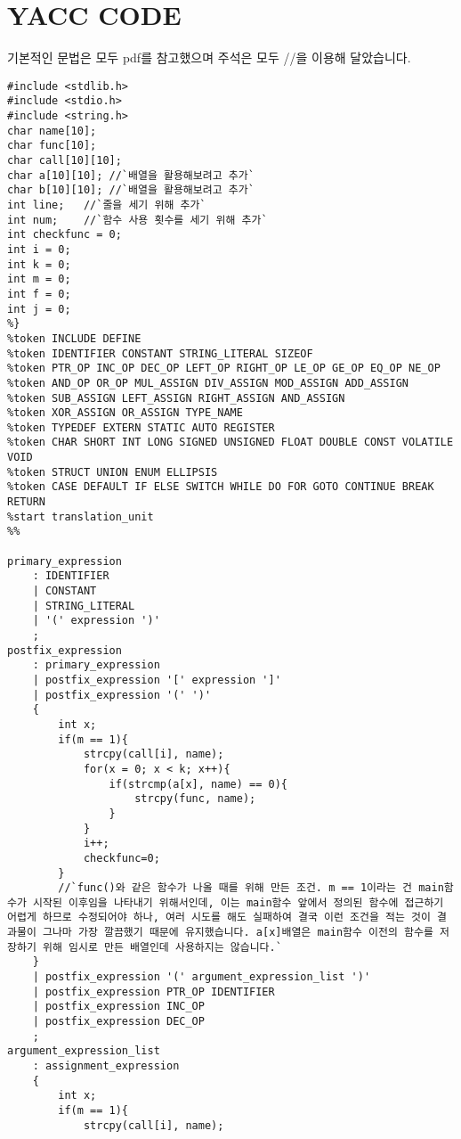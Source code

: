 \documentclass{article}
\begin{document}
\section{YACC CODE}
기본적인 문법은 모두 pdf를 참고했으며 주석은 모두 //을 이용해 달았습니다.
\begin{lstlisting}[escapeinside=``]
%{
#include <stdlib.h>
#include <stdio.h>
#include <string.h>
char name[10];
char func[10];
char call[10][10];
char a[10][10]; //`배열을 활용해보려고 추가`
char b[10][10]; //`배열을 활용해보려고 추가`
int line;   //`줄을 세기 위해 추가`
int num;    //`함수 사용 횟수를 세기 위해 추가`
int checkfunc = 0;
int i = 0;
int k = 0;
int m = 0;
int f = 0;
int j = 0;
%}
%token INCLUDE DEFINE
%token IDENTIFIER CONSTANT STRING_LITERAL SIZEOF
%token PTR_OP INC_OP DEC_OP LEFT_OP RIGHT_OP LE_OP GE_OP EQ_OP NE_OP
%token AND_OP OR_OP MUL_ASSIGN DIV_ASSIGN MOD_ASSIGN ADD_ASSIGN
%token SUB_ASSIGN LEFT_ASSIGN RIGHT_ASSIGN AND_ASSIGN
%token XOR_ASSIGN OR_ASSIGN TYPE_NAME
%token TYPEDEF EXTERN STATIC AUTO REGISTER
%token CHAR SHORT INT LONG SIGNED UNSIGNED FLOAT DOUBLE CONST VOLATILE VOID
%token STRUCT UNION ENUM ELLIPSIS
%token CASE DEFAULT IF ELSE SWITCH WHILE DO FOR GOTO CONTINUE BREAK RETURN
%start translation_unit
%%

primary_expression
	: IDENTIFIER 
	| CONSTANT
	| STRING_LITERAL
	| '(' expression ')'
	;
postfix_expression
	: primary_expression
	| postfix_expression '[' expression ']' 
	| postfix_expression '(' ')'	
	{	
		int x;
		if(m == 1){
			strcpy(call[i], name);
			for(x = 0; x < k; x++){
				if(strcmp(a[x], name) == 0){
					strcpy(func, name);
				}
			}
			i++;
			checkfunc=0;
		}
        //`func()와 같은 함수가 나올 때를 위해 만든 조건. m == 1이라는 건 main함수가 시작된 이후임을 나타내기 위해서인데, 이는 main함수 앞에서 정의된 함수에 접근하기 어렵게 하므로 수정되어야 하나, 여러 시도를 해도 실패하여 결국 이런 조건을 적는 것이 결과물이 그나마 가장 깔끔했기 때문에 유지했습니다. a[x]배열은 main함수 이전의 함수를 저장하기 위해 임시로 만든 배열인데 사용하지는 않습니다.`
	}
	| postfix_expression '(' argument_expression_list ')'
	| postfix_expression PTR_OP IDENTIFIER 
	| postfix_expression INC_OP 
	| postfix_expression DEC_OP 
	;
argument_expression_list
	: assignment_expression
	{	
		int x;
		if(m == 1){
			strcpy(call[i], name);
			

\end{lstlisting}
\end{document}
